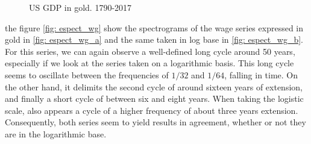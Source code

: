 \documentclass[a4paper]{article}
\begin{document}
	\begin{figure}[H]
		\centering
		\caption{US GDP in gold. 1790-2017} \label{fig:espect_PBI}
	\end{figure}
	
	the figure \ref{fig: espect_wg} show the spectrograms of the wage series expressed in gold in \ref{fig: espect_wg_a} and the same taken in log base in \ref{fig: espect_wg_b}. For this series, we can again observe a well-defined long cycle around 50 years, especially if we look at the series taken on a logarithmic basis. This long cycle seems to oscillate between the frequencies of $1/32$ and $1/64$, falling in time. On the other hand, it delimits the second cycle of around sixteen years of extension, and finally a short cycle of between six and eight years. When taking the logistic scale, also appears a cycle of a higher frequency of about three years extension. Consequently, both series seem to yield results in agreement, whether or not they are in the logarithmic base.
	
\end{document}
